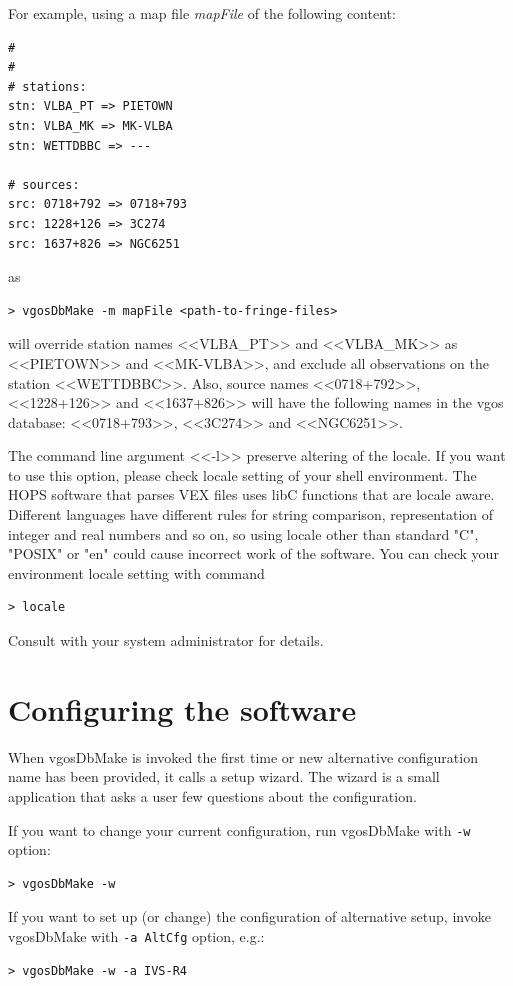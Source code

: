 \documentclass [10pt,letterpaper]{report}
\begin{document}
For example, using a map file {\sl mapFile} of the following content:
\begin{verbatim}
#
#
# stations:
stn: VLBA_PT => PIETOWN
stn: VLBA_MK => MK-VLBA
stn: WETTDBBC => ---

# sources:
src: 0718+792 => 0718+793
src: 1228+126 => 3C274
src: 1637+826 => NGC6251
\end{verbatim}
\noindent
as
\begin{verbatim}
> vgosDbMake -m mapFile <path-to-fringe-files>
\end{verbatim}
\noindent
will override station names <<VLBA\_PT>> and <<VLBA\_MK>> as <<PIETOWN>> and
<<MK-VLBA>>, and exclude all observations on the station <<WETTDBBC>>. Also,
source names <<0718+792>>, <<1228+126>> and <<1637+826>> will have the following
names in the vgos database: <<0718+793>>, <<3C274>> and <<NGC6251>>.


The command line argument <<-l>> preserve altering of the locale. If you want to
use this option,
please check locale setting of your shell environment.
The HOPS software that parses VEX files uses libC functions that are locale
aware. Different languages have different rules for string comparison,
representation of integer and real numbers and so on, so using locale other
than standard "C", "POSIX" or "en" could cause incorrect work of the
software. You can check your environment locale setting with command
\begin{verbatim}
> locale
\end{verbatim}
\noindent
Consult with your system administrator for details.





%
%
\chapter{Configuring the software}
When vgosDbMake is invoked the first time or new alternative
configuration name has been provided, it calls a setup wizard. The
wizard is a small application that asks a user few questions about the
configuration.

If you want to change your current configuration, run vgosDbMake with
{\tt -w} option:
\begin{verbatim}
> vgosDbMake -w
\end{verbatim}
\noindent
If you want to set up (or change) the configuration of alternative setup,
invoke vgosDbMake with {\tt -a AltCfg} option, e.g.:
\begin{verbatim}
> vgosDbMake -w -a IVS-R4
\end{verbatim}
\end{document}
